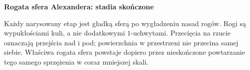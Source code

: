 \documentclass[11pt,a4paper]{article}
\begin{document}
\begin{center}
  {\Large\bfseries Rogata sfera Alexandera: stadia skończone}\par
  \medskip
  
\end{center}

\noindent
Każdy narysowany etap jest gładką sferą po wygładzeniu nasad rogów.
Rogi są wypukłościami kuli, a nie dodatkowymi $1$-uchwytami.
Przecięcia na rzucie oznaczają przejścia nad i pod; powierzchnia
w przestrzeni nie przecina samej siebie. Właściwa rogata sfera
powstaje dopiero przez nieskończone powtarzanie tego samego
sprzężenia w coraz mniejszej skali.
\end{document}

